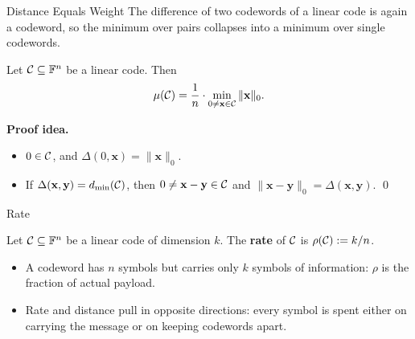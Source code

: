 \documentclass{zkdl-presentation-template}
\begin{document}
    \begin{frame}{Distance Equals Weight}
        The difference of two codewords of a linear code is again a codeword, so the minimum over pairs collapses into a minimum over single codewords.

        \begin{proposition}
            Let $\mathcal{C} \subseteq \mathbb{F}^n$ be a linear code. Then
            \begin{equation*}
                \mu(\mathcal{C}) = \frac{1}{n}\cdot \min_{0 \neq \mathbf{x} \in \mathcal{C}} \|\mathbf{x}\|_0.
            \end{equation*}
        \end{proposition}
        \pause

        \textbf{Proof idea.}
        \begin{itemize}
            \item[$\leq$] $0 \in \mathcal{C}$, and $\Delta(0, \mathbf{x}) = \|\mathbf{x}\|_0$.\pause
            \item[$\geq$] If $\Delta(\mathbf{x}, \mathbf{y}) = d_{\min}(\mathcal{C})$, then $0 \neq \mathbf{x} - \mathbf{y} \in \mathcal{C}$ and $\|\mathbf{x} - \mathbf{y}\|_0 = \Delta(\mathbf{x}, \mathbf{y})$. \qed
        \end{itemize}
    \end{frame}

    \begin{frame}{Rate}
        \begin{definition}[Rate]
            Let $\mathcal{C} \subseteq \mathbb{F}^n$ be a linear code of dimension $k$. The \textbf{rate} of $\mathcal{C}$ is $\rho(\mathcal{C}) := k/n$.
        \end{definition}
        \pause

        \begin{itemize}
            \item A codeword has $n$ symbols but carries only $k$ symbols of information: $\rho$ is the fraction of actual payload.\pause
            \item Rate and distance pull in opposite directions: every symbol is spent either on carrying the message or on keeping codewords apart.
        \end{itemize}
    \end{frame}
\end{document}
